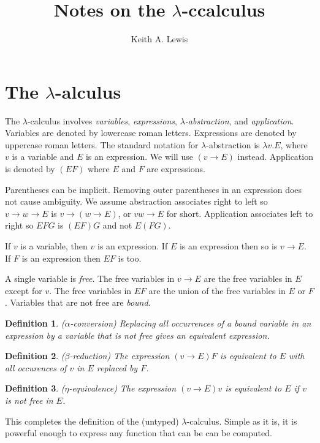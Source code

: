 \documentclass[11pt,letterpaper,fleqn]{report}
\author{Keith A. Lewis}
\title{Notes on the \(\lambda\)-ccalculus}
\newtheorem{definition}{Definition}[section]
\begin{document}
\maketitle
\section{The \texorpdfstring{\(\lambda\)-} calculus}
The \(\lambda\)-calculus involves {\em variables}, {\em expressions}, 
{\em \(\lambda\)-abstraction}, and {\em application}.
Variables are denoted by lowercase roman letters. Expressions
are denoted by uppercase roman letters. The standard notation
for \(\lambda\)-abstraction is \(\lambda v . E\), where \(v\) is
a variable and \(E\) is an expression. We will use \((v\to E)\) instead.
Application is denoted by \((E F)\) where \(E\) and \(F\) are expressions.

Parentheses can be implicit. Removing outer parentheses in an expression
does not cause ambiguity. We assume abstraction associates right to left
so \(v\to w\to E\) is \(v\to (w\to E)\), or \(vw\to E\) for short.
Application associates left to right so \(EFG\) is \((EF)G\) and not \(E(FG)\).

If \(v\) is a variable, then \(v\) is an expression. If \(E\) is an expression
then so is \(v\to E\). If \(F\) is an expression then \(EF\) is too.

A single variable is {\em free}. The free variables in \(v\to E\) are the free
variables in \(E\) except for \(v\). The free variables in \(EF\) are the union
of the free variables in \(E\) or \(F\). Variables that are not free are {\em bound}.
\begin{definition}{(\(\alpha\)-conversion)}
Replacing all occurrences of a bound variable in an expression
by a variable that is not free gives an equivalent expression.
\end{definition}
\begin{definition}{(\(\beta\)-reduction)}
The expression \((v\to E)F\) is equivalent to
\(E\) with all occurences of \(v\) in \(E\) replaced by \(F\).
\end{definition}
\begin{definition}{(\(\eta\)-equivalence)}
The expression \((v\to E)v\) is equivalent to \(E\)
if \(v\) is not free in \(E\).
\end{definition}

This completes the definition of the (untyped) \(\lambda\)-calculus.
Simple as it is, it is powerful enough to express any function that can
be can be computed.
\end{document}
